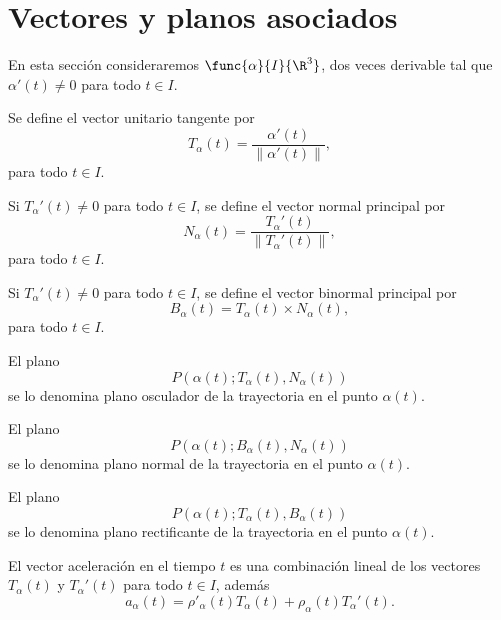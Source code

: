 \documentclass[a4,11pt]{aleph-notas}
\begin{document}
\encabezado

\section{Vectores y planos asociados}

En esta sección consideraremos $\func{\alpha}{I}{\R^3}$, dos veces derivable tal que $\alpha'(t)\neq 0$ para todo $t\in I$.

\begin{defi}
    Se define el vector unitario tangente por
    \[
        T_\alpha(t)=\frac{\alpha'(t)}{\|\alpha'(t)\|},
    \]
    para todo $t\in I$.
\end{defi}

\begin{defi}
    Si $T_\alpha'(t)\neq 0$ para todo $t\in I$, se define el vector normal principal por
    \[
        N_\alpha(t)=\frac{T_\alpha'(t)}{\|T_\alpha'(t)\|},
    \]
    para todo $t\in I$.
\end{defi}

\begin{defi}
    Si $T_\alpha'(t)\neq 0$ para todo $t\in I$, se define el vector binormal principal por
    \[
        B_\alpha(t)=T_\alpha(t)\times N_\alpha(t),
    \]
    para todo $t\in I$.
\end{defi}

\begin{defi}
    El plano
    \[
        P(\alpha(t);T_\alpha(t),N_\alpha(t))
    \]
    se lo denomina plano osculador de la trayectoria en el punto $\alpha(t)$.
\end{defi}

\begin{defi}
    El plano
    \[
        P(\alpha(t);B_\alpha(t),N_\alpha(t))
    \]
    se lo denomina plano normal de la trayectoria en el punto $\alpha(t)$.
\end{defi}

\begin{defi}
    El plano
    \[
        P(\alpha(t);T_\alpha(t),B_\alpha(t))
    \]
    se lo denomina plano rectificante de la trayectoria en el punto $\alpha(t)$.
\end{defi}

\begin{prop}
    El vector aceleración en el tiempo $t$ es una combinación lineal de los vectores $T_\alpha(t)$ y $T_\alpha'(t)$ para todo $t\in I$, además
    \[
        a_\alpha(t)=\rho'_\alpha(t) T_\alpha(t)+\rho_\alpha(t) T_\alpha'(t).
    \]
\end{prop}
\end{document}
